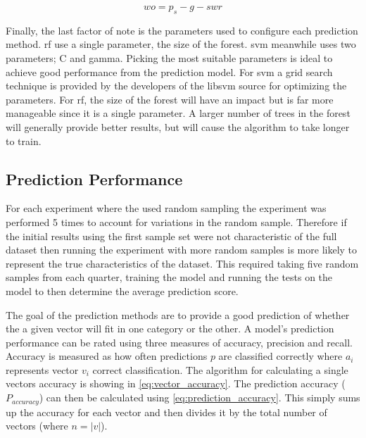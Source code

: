 \begin{equation} 
\label{eq:window_offset}
wo = p_s - g - swr 
\end{equation}

Finally, the last factor of note is the parameters used to configure each prediction method. \gls{rf} use a single parameter, the size of the forest. \gls{svm} meanwhile uses two parameters; C and gamma. Picking the most suitable parameters is ideal to achieve good performance from the prediction model. For \gls{svm} a grid search technique is provided by the developers of the libsvm source %
for optimizing the parameters. For \gls{rf}, the size of the forest will have an impact but is far more manageable since it is a single parameter. A larger number of trees in the forest will generally provide better results, but will cause the algorithm to take longer to train.

\subsection{Prediction Performance}

For each experiment where the used random sampling the experiment was performed 5 times to account for variations in the random sample. Therefore if the initial results using the first sample set were not characteristic of the full dataset then running the experiment with more random samples is more likely to represent the true characteristics of the dataset. This required taking five random samples from each quarter, training the model and running the tests on the model to then determine the average prediction score. %

The goal of the prediction methods are to provide a good prediction of whether the a given vector will fit in one category or the other. A model's prediction performance can be rated using three measures of accuracy, precision and recall. Accuracy is measured as how often predictions $p$ are classified correctly where $a_i$ represents vector $v_i$ correct classification. The algorithm for calculating a single vectors accuracy is showing in \autoref{eq:vector_accuracy}. The prediction accuracy ($P_{accuracy}$) can then be calculated using \autoref{eq:prediction_accuracy}. This simply sums up the accuracy for each vector and then divides it by the total number of vectors (where $n = |v|$).

